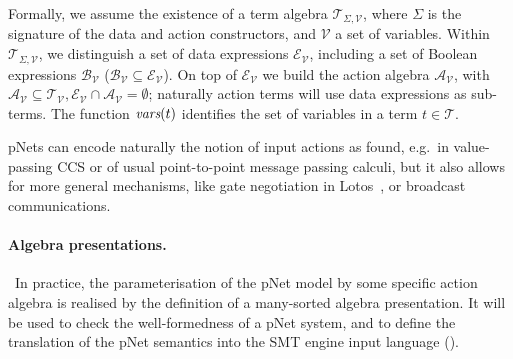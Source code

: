 \documentclass[smallcondensed]{svjour3}
\newcommand{\cT}{\ensuremath{\mathcal{T}}}
\newcommand{\cV}{\ensuremath{\mathcal{V}}}
\newcommand{\signature}{\ensuremath{\Sigma}}
\newcommand{\variables}{\ensuremath{\cV}}
\newcommand{\Talg}{\ensuremath{\cT_{\signature,\variables}}}
\def\AlgT{\mathcal{T}}
\newcommand{\eg}[1][\ ]{e.g.#1}
\begin{document}
\renewcommand{\P}{\mathcal V}
\def\Talg{\mathcal{T}_{\Sigma,\P}}
Formally, we assume the existence of a term algebra $\Talg$,
where $\Sigma$ is the signature of the data and action constructors,
and $\P$ a set of variables. Within $\Talg$, we distinguish a set of
data expressions $\mathcal{E}_\P$, including a set of Boolean
expressions $\mathcal{B}_{\P}$ ($\mathcal{B}_{\P}\subseteq\mathcal{E}_\P$).
On top of $\mathcal{E}_\P$ we build the action algebra
$\mathcal{A}_\P$, with $\mathcal{A}_\P\subseteq\mathcal{T}_\P,
\mathcal{E}_\P\cap\mathcal{A}_\P=\emptyset$;
naturally action terms will use data expressions as sub-terms.
The function $\vars(t)$ identifies the set of variables in a term
$t\in\AlgT$.

pNets can encode naturally the notion of input actions as found,
\eg in value-passing CCS 
\cite{Milner89} or of usual point-to-point message passing calculi,
but it also allows 
for more general mechanisms, like gate negotiation in Lotos~\cite{LotosISO89}, or broadcast
communications.

\paragraph*{Algebra presentations.}\
In practice, the parameterisation of the pNet model by some specific
action algebra is realised by the definition of a many-sorted algebra
presentation. It will be used to check the
well-formedness of a pNet system, and to define the translation of the pNet
semantics into the SMT engine input language (\cite{BarFT-RR-17}).
\end{document}
